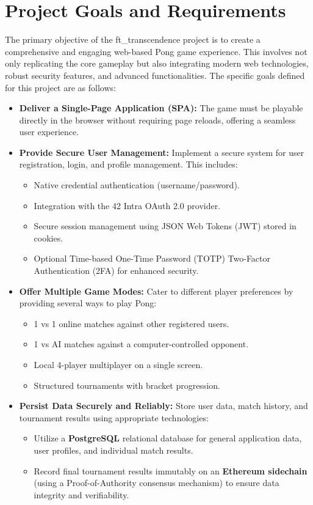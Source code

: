 \chapter{Project Goals and Requirements}
\label{ch:goals}

The primary objective of the ft\_transcendence project is to create a comprehensive and engaging web-based Pong game experience. This involves not only replicating the core gameplay but also integrating modern web technologies, robust security features, and advanced functionalities. The specific goals defined for this project are as follows:

\begin{itemize}
    \item \textbf{Deliver a Single-Page Application (SPA):} The game must be playable directly in the browser without requiring page reloads, offering a seamless user experience.
    
    \item \textbf{Provide Secure User Management:} Implement a secure system for user registration, login, and profile management. This includes:
    \begin{itemize}
        \item Native credential authentication (username/password).
        \item Integration with the 42 Intra OAuth 2.0 provider.
        \item Secure session management using JSON Web Tokens (JWT) stored in cookies.
        \item Optional Time-based One-Time Password (TOTP) Two-Factor Authentication (2FA) for enhanced security.
    \end{itemize}
    
    \item \textbf{Offer Multiple Game Modes:} Cater to different player preferences by providing several ways to play Pong:
    \begin{itemize}
        \item 1 vs 1 online matches against other registered users.
        \item 1 vs AI matches against a computer-controlled opponent.
        \item Local 4-player multiplayer on a single screen.
        \item Structured tournaments with bracket progression.
    \end{itemize}
    
    \item \textbf{Persist Data Securely and Reliably:} Store user data, match history, and tournament results using appropriate technologies:
    \begin{itemize}
        \item Utilize a \textbf{PostgreSQL} relational database for general application data, user profiles, and individual match results.
        \item Record final tournament results immutably on an \textbf{Ethereum sidechain} (using a Proof-of-Authority consensus mechanism) to ensure data integrity and verifiability.
    \end{itemize}
    

\end{itemize}

